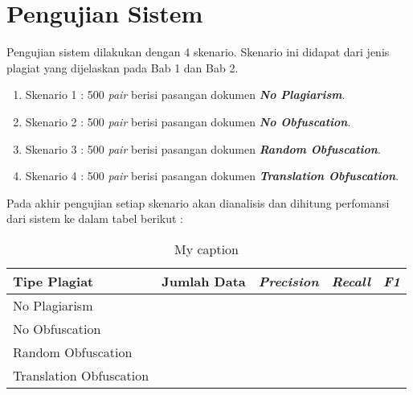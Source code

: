 \documentclass[../Book.tex]{subfiles}
\begin{document}
\section{Pengujian Sistem}
Pengujian sistem dilakukan dengan 4 skenario. Skenario ini didapat dari jenis plagiat yang dijelaskan pada Bab 1 dan Bab 2. 

\begin{enumerate}
	\item Skenario 1 : 500 \textit{pair} berisi pasangan dokumen \textit{\textbf{No Plagiarism}}.
	\item Skenario 2 : 500 \textit{pair} berisi pasangan dokumen \textit{\textbf{No Obfuscation}}.
	\item Skenario 3 : 500 \textit{pair} berisi pasangan dokumen \textit{\textbf{Random Obfuscation}}.
	\item Skenario 4 : 500 \textit{pair} berisi pasangan dokumen \textit{\textbf{Translation Obfuscation}}.
\end{enumerate}

Pada akhir pengujian setiap skenario akan dianalisis dan dihitung perfomansi dari sistem ke dalam tabel berikut :

\begin{table}[H]
	\centering
	\caption{My caption}
	\label{my-label}
	\begin{tabular}{@{}lllll@{}}
		\toprule
		Tipe Plagiat            & Jumlah Data & \textit{Precision} & \textit{Recall} & \textit{F1} \\ \midrule
		No Plagiarism           &             &                    &                 &             \\
		No Obfuscation          &             &                    &                 &             \\
		Random Obfuscation      &             &                    &                 &             \\
		Translation Obfuscation &             &                    &                 &             \\ \bottomrule
	\end{tabular}
\end{table}
\end{document}
